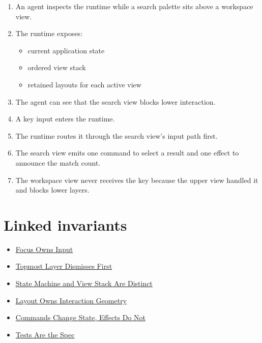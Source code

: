 \begin{enumerate}
\def\labelenumi{\arabic{enumi}.}
\tightlist
\item
  An agent inspects the runtime while a search palette sits above a workspace view.
\item
  The runtime exposes:

  \begin{itemize}
  \tightlist
  \item
    current application state
  \item
    ordered view stack
  \item
    retained layouts for each active view
  \end{itemize}
\item
  The agent can see that the search view blocks lower interaction.
\item
  A key input enters the runtime.
\item
  The runtime routes it through the search view's input path first.
\item
  The search view emits one command to select a result and one effect to announce the match count.
\item
  The workspace view never receives the key because the upper view handled it and blocks lower layers.
\end{enumerate}

\section{Linked invariants}\label{record-149-linked-invariants}

\begin{itemize}
\tightlist
\item
  \href{https://github.com/flyingrobots/bijou/blob/cbd70612140e7a450d764b3c7be1c6af878b99bc/docs/invariants/focus-owns-input.md}{Focus Owns Input}
\item
  \href{https://github.com/flyingrobots/bijou/blob/cbd70612140e7a450d764b3c7be1c6af878b99bc/docs/invariants/topmost-layer-dismisses-first.md}{Topmost Layer Dismisses First}
\item
  \href{https://github.com/flyingrobots/bijou/blob/cbd70612140e7a450d764b3c7be1c6af878b99bc/docs/invariants/state-machine-and-view-stack-are-distinct.md}{State Machine and View Stack Are Distinct}
\item
  \href{https://github.com/flyingrobots/bijou/blob/cbd70612140e7a450d764b3c7be1c6af878b99bc/docs/invariants/layout-owns-interaction-geometry.md}{Layout Owns Interaction Geometry}
\item
  \href{https://github.com/flyingrobots/bijou/blob/cbd70612140e7a450d764b3c7be1c6af878b99bc/docs/invariants/commands-change-state-effects-do-not.md}{Commands Change State, Effects Do Not}
\item
  \href{https://github.com/flyingrobots/bijou/blob/cbd70612140e7a450d764b3c7be1c6af878b99bc/docs/invariants/tests-are-the-spec.md}{Tests Are the Spec}
\end{itemize}

